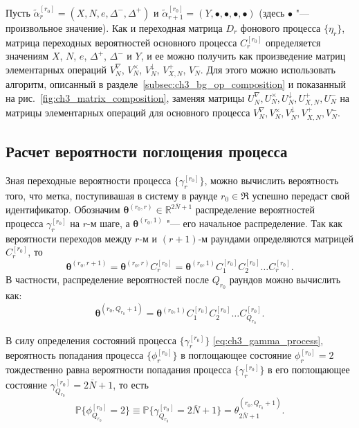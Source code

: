 Пусть $\widetilde{\alpha}_r^{[r_0]} = (X, N, e, \Delta^-, \Delta^+)$ и $\widetilde{\alpha}_{r+1}^{[r_0]} = (Y, \bullet, \bullet, \bullet, \bullet)$ (здесь $\bullet$ "--- произвольное значение). Как и переходная матрица $D_r$ фонового процесса $\{ \eta_r \}$, матрица переходных вероятностей основного процесса $C_r^{[r_0]}$ определяется значениям $X$, $N$, $e$, $\Delta^+$, $\Delta^-$ и $Y$, и ее можно получить как произведение матриц элементарных операций $V_N^\nabla$, $V_N^\times$, $V_N^\downarrow$, $V_{X,N}^+$, $V_N^-$. Для этого можно использовать алгоритм, описанный в разделе~\ref{subsec:ch3_bg_op_composition} и показанный на рис.~\ref{fig:ch3_matrix_composition}, заменяя матрицы $U_N^\nabla, U_N^\times, U_N^\downarrow, U_{X,N}^+, U_N^-$ на матрицы элементарных операций для основного процесса $V_N^\nabla, V_N^\times, V_N^\downarrow, V_{X,N}^+, V_N^-$.



\subsection{Расчет вероятности поглощения процесса}
Зная переходные вероятности процесса $\{ \gamma_r^{[r_0]} \}$, можно вычислить вероятность того, что метка, поступивашая в систему в раунде $r_0 \in \mathfrak{R}$ успешно передаст свой идентификатор. Обозначим $\bm{\theta}^{(r_0,r)} \in \mathbb{R}^{2\overline{N}+1}$ распределение вероятностей процесса $\gamma_r^{[r_0]}$ на $r$-м шаге, а $\bm{\theta}^{(r_0,1)}$ "--- его начальное распределение. Так как вероятности переходов между $r$-м и $(r+1)$-м раундами определяются матрицей $C_r^{[r_0]}$, то
$$
\bm{\theta}^{(r_0,r+1)} = \bm{\theta}^{(r_0,r)} C_{r}^{[r_0]} = \bm{\theta}^{(r_0,1)} C_1^{[r_0]} C_2^{[r_0]} \dots C_r^{[r_0]}.
$$
В частности, распределение вероятностей после $Q_{r_0}$ раундов можно вычислить как:
$$
\bm{\theta}^{(r_0, Q_{r_0} + 1)} = \bm{\theta}^{(r_0, 1)} C^{[r_0]}_1 C^{[r_0]}_2 \dots C^{[r_0]}_{Q_{r_0}}.
$$

В силу определения состояний процесса $\{ \gamma_r^{[r_0]} \}$ \eqref{eq:ch3_gamma_process}, вероятность попадания процесса $\{ \phi_r^{[r_0]} \}$ в поглощающее состояние $\phi_r^{[r_0]} = 2$ тождественно равна вероятности попадания процесса $\{ \gamma_r^{[r_0]} \}$ в его поглощающее состояние $\gamma_{Q_{r_0}}^{[r_0]} = 2\overline{N}+1$, то есть
$$
	\mathbb{P}\{ \phi_{Q_{r_0}}^{[r_0]} = 2 \} \equiv \mathbb{P}\{ \gamma_{Q_{r_0}}^{[r_0]} = 2\overline{N}+1 \} = \theta_{2\overline{N}+1}^{(r_0, Q_{r_0}+1)}.
$$

